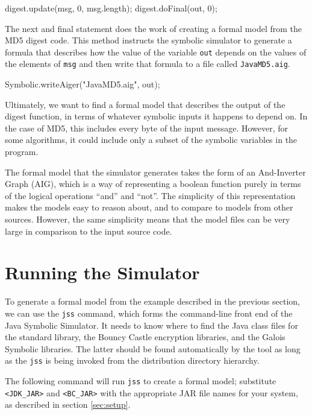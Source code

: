 \documentclass[11pt]{article}
\begin{document}
\begin{code}
digest.update(msg, 0, msg.length);
digest.doFinal(out, 0);
\end{code}

The next and final statement does the work of creating a formal model
from the MD5 digest code. This method instructs the symbolic simulator
to generate a formula that describes how the value of the variable
\texttt{out} depends on the values of the elements of \texttt{msg} and
then write that formula to a file called \texttt{JavaMD5.aig}.

\begin{code}
Symbolic.writeAiger("JavaMD5.aig", out);
\end{code}

Ultimately, we want to find a formal model that describes the output
of the digest function, in terms of whatever symbolic inputs it
happens to depend on. In the case of MD5, this includes every byte of
the input message. However, for some algorithms, it could include only
a subset of the symbolic variables in the program.

The formal model that the simulator generates takes the form of an
And-Inverter Graph (AIG), which is a way of representing a boolean
function purely in terms of the logical operations ``and'' and
``not''. The simplicity of this representation makes the models easy
to reason about, and to compare to models from other sources.
However, the same simplicity means that the model files can be very
large in comparison to the input source code.

\section{Running the Simulator}

To generate a formal model from the example described in the previous
section, we can use the \texttt{jss} command, which forms the
command-line front end of the Java Symbolic Simulator. It needs to know
where to find the Java class files for the standard library, the Bouncy
Castle encryption libraries, and the Galois Symbolic libraries.  The
latter should be found automatically by the tool as long as the
\texttt{jss} is being invoked from the distribution directory hierarchy.  

The following command will run \texttt{jss} to create a formal model;
substitute \texttt{<JDK\_JAR>} and \texttt{<BC\_JAR>} with the appropriate
JAR file names for your system, as described in section \ref{sec:setup}.
\end{document}
